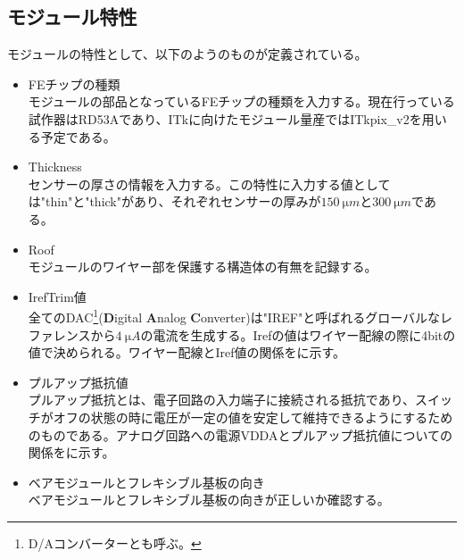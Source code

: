 \subsection{モジュール特性}
\label{sec:module-prop}
モジュールの特性として、以下のようのものが定義されている。
\begin{itemize}
  \item FEチップの種類 \\
  モジュールの部品となっているFEチップの種類を入力する。現在行っている試作器はRD53Aであり、ITkに向けたモジュール量産ではITkpix\_v2を用いる予定である。
  \item Thickness \\
  センサーの厚さの情報を入力する。この特性に入力する値としては"thin"と"thick"があり、それぞれセンサーの厚みが$150\ \si{\micro m}$と$300\ \si{\micro m}$である。
  \item Roof \\
  モジュールのワイヤー部を保護する構造体の有無を記録する。
  \item IrefTrim値\\
  全てのDAC\footnote{D/Aコンバーターとも呼ぶ。}(\textbf{D}igital \textbf{A}nalog \textbf{C}onverter)は"IREF"と呼ばれるグローバルなレファレンスから$4\ \si{\micro A}$の電流を生成する。Irefの値はワイヤー配線の際に4bitの値で決められる。ワイヤー配線とIref値の関係をに示す。
  \item プルアップ抵抗値\\
  プルアップ抵抗とは、電子回路の入力端子に接続される抵抗であり、スイッチがオフの状態の時に電圧が一定の値を安定して維持できるようにするためのものである。アナログ回路への電源VDDAとプルアップ抵抗値についての関係をに示す。
  \item ベアモジュールとフレキシブル基板の向き \\
  ベアモジュールとフレキシブル基板の向きが正しいか確認する。
\end{itemize}


